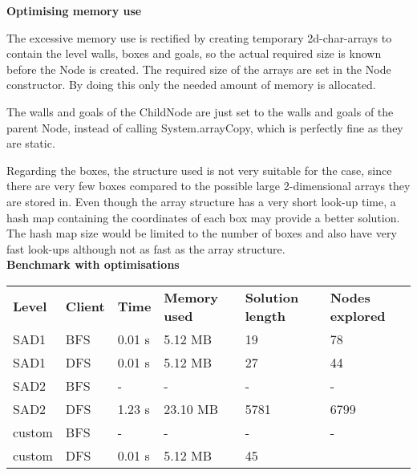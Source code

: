 \documentclass[Main]{subfiles}
\begin{document}
\textbf{Optimising memory use}

The excessive memory use is rectified by creating temporary 2d-char-arrays to contain the level walls, boxes and goals, so the actual required size is known before the Node is created. The required size of the arrays are set in the Node constructor. By doing this only the needed amount of memory is allocated. 

The walls and goals of the ChildNode are just set to the walls and goals of the parent Node, instead of calling System.arrayCopy, which is perfectly fine as they are static. 

Regarding the boxes, the structure used is not very suitable for the case, since there are very few boxes compared to the possible large 2-dimensional arrays they are stored in. Even though the array structure has a very short look-up time, a hash map containing the coordinates of each box may provide a better solution. The hash map size would be limited to the number of boxes and also have very fast look-ups although not as fast as the array structure. 
\\


\textbf{Benchmark with optimisations}

\begin{table}[ht]
\begin{tabular}{llllll}
\rowcolor[HTML]{EFEFEF} 
\textbf{Level} & \textbf{Client} & \textbf{Time} & \textbf{Memory used} & \textbf{Solution length} & \textbf{Nodes explored} \\
SAD1           & BFS             & 0.01 s        & 5.12 MB              & 19                       & 78                      \\
SAD1           & DFS             & 0.01 s        & 5.12 MB              & 27                       & 44                      \\
SAD2           & BFS             & -           & -                  & -                      & -                     \\
SAD2           & DFS             & 1.23 s        & 23.10 MB             & 5781                     & 6799                    \\
custom         & BFS             & -           & -                  & -                      & -                     \\
custom         & DFS             & 0.01 s        & 5.12 MB              & 45                       &                        
\end{tabular}
\end{table}
\end{document}

